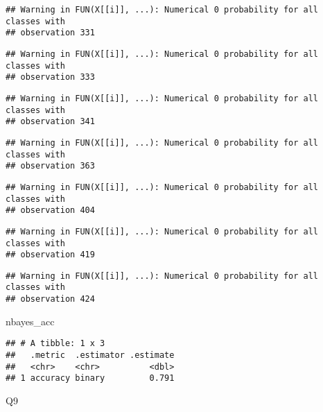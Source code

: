 \documentclass[]{article}
\newenvironment{Shaded}{\begin{snugshade}}{\end{snugshade}}
\newcommand{\NormalTok}[1]{#1}
\begin{document}
\begin{verbatim}
## Warning in FUN(X[[i]], ...): Numerical 0 probability for all classes with
## observation 331
\end{verbatim}

\begin{verbatim}
## Warning in FUN(X[[i]], ...): Numerical 0 probability for all classes with
## observation 333
\end{verbatim}

\begin{verbatim}
## Warning in FUN(X[[i]], ...): Numerical 0 probability for all classes with
## observation 341
\end{verbatim}

\begin{verbatim}
## Warning in FUN(X[[i]], ...): Numerical 0 probability for all classes with
## observation 363
\end{verbatim}

\begin{verbatim}
## Warning in FUN(X[[i]], ...): Numerical 0 probability for all classes with
## observation 404
\end{verbatim}

\begin{verbatim}
## Warning in FUN(X[[i]], ...): Numerical 0 probability for all classes with
## observation 419
\end{verbatim}

\begin{verbatim}
## Warning in FUN(X[[i]], ...): Numerical 0 probability for all classes with
## observation 424
\end{verbatim}

\begin{Shaded}
\begin{Highlighting}[]
\NormalTok{nbayes_acc}
\end{Highlighting}
\end{Shaded}

\begin{verbatim}
## # A tibble: 1 x 3
##   .metric  .estimator .estimate
##   <chr>    <chr>          <dbl>
## 1 accuracy binary         0.791
\end{verbatim}

Q9
\end{document}
